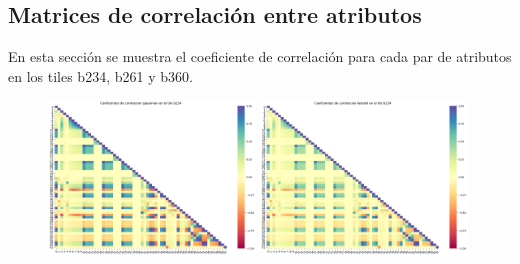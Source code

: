 \begin{appendix}
\section{Matrices de correlación entre atributos}
\label{anexo_matrices_correlacion}
En esta sección se muestra el coeficiente de correlación para cada par de atributos en los tiles b234, b261 y b360.

\begin{figure}[h!]
\centering
  \includegraphics[width=0.49\textwidth]{Kap6/spearman_b234_MATRIX.png} 
  \includegraphics[width=0.49\textwidth]{Kap6/kendall_b234_MATRIX.png}
\end{figure}


\end{appendix}
